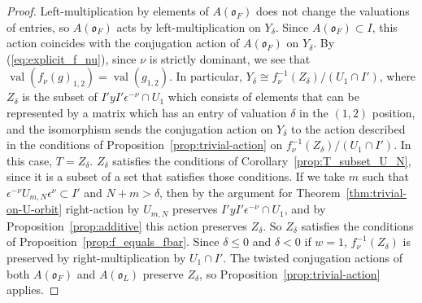 \documentclass{amsart}
\theoremstyle{definition}
\def\O{\mathfrak{o}}
\def\e{\epsilon}
\def\val{\mathop{\mathrm{val}}}
\def\A{A(\O_F)}
\def\en{\e^{\nu}}
\def\enm{\e^{-\nu}}
\def\f{f_\nu}
\def\Umn{U_{m,N}}
\begin{document}
  \begin{proof}
    Left-multiplication by elements of $\A$ does not change the valuations of
    entries, so $\A$ acts by left-multiplication on $Y_\delta$.  Since $\A
    \subset I$, this action coincides with the conjugation action of $\A$ on
    $Y_\delta$.  By (\ref{eq:explicit_f_nu}), since $\nu$ is strictly dominant,
    we see that $\val(\f(g)_{1,2}) = \val(g_{1,2})$.  In particular, $Y_\delta
    \cong \f^{-1}(Z_\delta)/(U_1 \cap I')$, where $Z_\delta$ is the subset of
    $I'yI'\enm \cap U_1$ which consists of elements that can be represented by
    a matrix which has an entry of valuation $\delta$ in the $(1,2)$ position,
    and the isomorphism sends the conjugation action on $Y_\delta$ to the
    action described in the conditions of Proposition~\ref{prop:trivial-action}
    on $\f^{-1}(Z_\delta)/(U_1 \cap I')$.  In this case, $T = Z_\delta$.
    $Z_\delta$ satisfies the conditions of Corollary~\ref{prop:T_subset_U_N},
    since it is a subset of a set that satisfies those conditions.  If we take
    $m$ such that $\enm\Umn\en \subset I'$ and $N + m > \delta$, then by the
    argument for Theorem~\ref{thm:trivial-on-U-orbit} right-action by $\Umn$
    preserves $I'yI'\enm \cap U_1$, and by Proposition~\ref{prop:additive} this
    action preserves $Z_\delta$.  So $Z_\delta$ satisfies the conditions of
    Proposition~\ref{prop:f_equals_fbar}.  Since $\delta \le 0$ and $\delta <
    0$ if $w = 1$, $\f^{-1}(Z_\delta)$ is preserved by right-multiplication by
    $U_1 \cap I'$.  The twisted conjugation actions of both $\A$ and $A(\O_L)$
    preserve $Z_\delta$, so Proposition~\ref{prop:trivial-action} applies.
  \end{proof}
\end{document}
